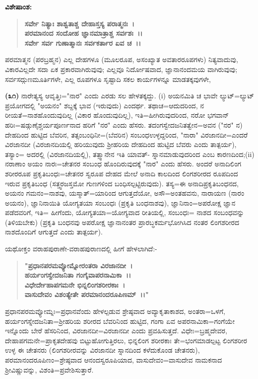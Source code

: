 \noindent
\textbf{ವಿಶೇಷಾಂಶ:\enginline{-}}

\begin{verse}
\textbf{ಸರ್ವೇ ನಿತ್ಯಾಃ ಶಾಶ್ವತಾಶ್ಚ ದೇಹಾಸ್ತಸ್ಯ ಪರಾತ್ಮನಃ~।}\\\textbf{ಪರಮಾನಂದ ಸಂದೋಹ ಜ್ಞಾನಮಾತ್ರಾಶ್ಚ ಸರ್ವಶಃ~।।}\\\textbf{ಸರ್ವೇ ಸರ್ವ ಗುಣಾತ್ಮಾನಃ ಸರ್ವಕರ್ತಾರ ಏವ ಚ~।।}
\end{verse}


ಪರಮಾತ್ಮನ (ಪರಬ್ರಹ್ಮನ) ಎಲ್ಲ ದೇಹಗಳೂ (ಮೂಲರೂಪ, ಅಸಂಖ್ಯಾತ ಅವತಾರರೂಪಗಳು) ನಿತ್ಯವಾದುವು, ವಿಕಾರವಿಲ್ಲದೇ ಸದಾ ಏಕ ಪ್ರಕಾರವಾಗಿರುವುವು; ಎಲ್ಲವೂ ನಿರ್ದೋಷವಾದ, ಜ್ಞಾನಾನಂದಮಯ ವಾಗಿರುವುವು; ಸರ್ವಸದ್ಗುಣಮೂರ್ತಿಗಳೇ, ಎಲ್ಲ ರೂಪಗಳೂ ಸೃಷ್ಟಾದಿ ಸಕಲ ಕಾರ್ಯಗಳನ್ನೂ ಮಾಡತಕ್ಕವುಗಳೇ,

\textbf{(೩೧)} ನಾರೇತ್ಯಸ್ಯ ಆವೃತ್ತಿಃ="ನಾರ" ಎಂದು ಎರಡು ಸಲ ಹೇಳತಕ್ಕದ್ದು. (i) ಅಯನಮಿತಿ ಚ ಭಾವೇ ಲ್ಯುಟ್=ಲ್ಯುಟ್ ಪ್ರಯೋಗದಲ್ಲಿ "ಅಯನಂ" ಶಬ್ದಕ್ಕೆ ಭಾವ (ಇರುವುದು) ಎಂದರ್ಥ. ತಥಾಚ=ಆದುದರಿಂದ, ನ ರೀಯತೆ=ನಾಶಹೊಂದುವುದಿಲ್ಲ (ವಿಕಾರ ಹೊಂದುವುದಿಲ್ಲ), ಇತಿ=ಹೀಗಿರುವುದರಿಂದ, ನರೋ ಭಗವಾನ್ ಹರಿಃ=ಷಡ್ಗುಣೈಶ್ಚರ್ಯಪೂರ್ಣನಾದ ಹರಿಗೆ "ನರ" ಎಂದು ಹೆಸರು. ತದಂಗಸ್ವೇದಜನಿತತ್ವೇನ=ಅವನ ("ನರ" ನ) ದೇಹದಿಂದ ಹುಟ್ಟಿದ ಬೆವರಿನ, ತತ್ಸಂಬಂಧಿನೀ=(ಬೆವರಿನ) ಸಂಬಂಧಉಳ್ಳದ್ದರಿಂದ, "ನಾರಾ" ವಿರಜಾನದೀ=ಎಂದರೆ ವಿರಜಾನದೀ (ವಿರಜಾನದಿಯಲ್ಲಿ ಹರಿಯುವುದು ಶ‍್ರೀಹರಿಯ ದೇಹದಿಂದ ಹುಟ್ಟಿದ ಬೆವರು ಎಂದು ತಾತ್ಪರ್ಯ), ತಸ್ಯಾಂ= ಅದರಲ್ಲಿ (ವಿರಜಾನದಿಯಲ್ಲಿ), ತತ್ಸ್ವಾನೇನ ಇತಿ ಯಾವತ್- ಸ್ನಾನಮಾಡುವುದರಿಂದ ಎಂಬ ಕಾರಣದಿಂದ;\break (ii) ನರಾಣಾಂ ಅಯಂ ನಾರಃ=ಚೇತನರ ಸಂಬಂಧ ಹೊಂದಿರುವುದಕ್ಕೆ "ನಾರ" ಎಂದು ಹೆಸರು. ಅಂದರೆ ಅನಾದಿಲಿಂಗ ಶರೀರರೂಪ ಪ್ರಕೃತಿಬಂಧಃ=ಚೇತನರ ಸ್ವರೂಪ ದೇಹದ ಮೇಲೆ ಅನಾದಿ ಕಾಲದಿಂದ ಲಿಂಗಶರೀರದ ರೂಪದಿಂದ ಇರುವ ಪ್ರಕೃತಿಬಂಧ (ಸತ್ತ್ವ\-ರಜಸ್ತಮೋ ಗುಣಗಳಿಂದ ಬಂಧಿಸಲ್ಪಟ್ಟಿರುವುದು). ತಸ್ಯ=ಈ ಅನಾದಿಪ್ರಕೃತಿಬಂಧನದ, ಅಯನಂ ಗಮನಂ=ನಾಶವು, ಯಸ್ಮಾತ್=ಯಾರಿಂದ ಆಗುತ್ತದೆಯೋ, ಅಸೌ=ಅಂತಹವನು, ನಾರಾಯಣ (ನಾರಂ ಅಯನಂ), ಜ್ಞಾನಿನಾಯಿತಿ ಯೋಗ್ಯತಯಾ ಸಂಬಂಧಃ (ಪ್ರಕೃತಿ ಬಂಧನಾಶವು), ಜ್ಞಾನಿನಾಂ=ಅಪರೋಕ್ಷ ಜ್ಞಾನ ಪಡೆದವರಿಗೆ, ಇತಿ= ಹೀಗೆಂದು, ಯೋಗ್ಯತಯಾ=ಯೋಗ್ಯವಾದ ರೀತಿಯಲ್ಲಿ, ಸಂಬಂಧಃ= ನಾಶದ ಸಂಬಂಧವನ್ನು (ತಿಳಿಯಬೇಕು) (ಪ್ರಕೃತಿ ಬಂಧನವು ಅಪರೋಕ್ಷ ಜ್ಞಾನಾನಂತರ ಪ್ರಾರಬ್ಧಕರ್ಮಭೋಗಿಸಿದ ನಂತರ ಲಿಂಗಶರೀರದ ನಾಶದೊಂದಿಗೆ ಆಗುತ್ತದೆ ಎಂದು ತಾತ್ಪರ್ಯ).

ಯಥೋಕ್ತಂ ವರಾಹಪುರಾಣೇ-ವರಾಹಪುರಾಣದಲ್ಲಿ ಹೀಗೆ ಹೇಳಲಾಗಿದೆ:-

\begin{verse}
\textbf{"ಪ್ರಧಾನಪರಮವ್ಯೋಮ್ನೋರಂತರಾ ವಿರಜಾನದೀ~।}\\\textbf{ಹರ್ಯಂಗಸ್ವೇದಜನಿತಾ ಗಂಗೈವಾಪರನಾಮಿಕಾ~।।}\\\textbf{ವಿಧೇರ್ದೇಹಾಪಗಮನೇ ಭಿನ್ನಲಿಂಗಶರೀರಕಾಃ~।}\\\textbf{ವಾಸುದೇವಂ ವಿಶಂತ್ಯೇತೇ ಪರಮಾನಂದರೂಪಿಣಮ್~।।"}
\end{verse}

ಪ್ರಧಾನಪರಮವ್ಯೋಮ್ನಃ=ಪ್ರಧಾನವೆಂದು ಹೇಳಲ್ಪಡುವ ಶ್ರೇಷ್ಠವಾದ ಅವ್ಯಾಕೃತಾಕಾಶದ, ಅಂತರಾ=ಒಳಗೆ, ಹರ್ಯಂಗಸ್ನೇದಜನಿತಾ=ಶ‍್ರೀಹರಿಯ ಶರೀರದ ಬೆವರಿನಿಂದ ಹುಟ್ಟಿದ, ಗಂಗಾ ಏವ ಅಪರನಾಮಿಕಾ=ಗಂಗೆಯೇ ಇನ್ನೊಂದು ಬೇರೆ ಹೆಸರಿನಿಂದ, ವಿರಜಾನದೀ=ವಿರಜಾನದೀ ಎಂದು ಪ್ರವಹಿಸುತ್ತದೆ. ವಿಧೇಃ=ಬ್ರಹ್ಮದೇವರ, ದೇಹಾಪಗಮನೇ=\-ಪ್ರಾಕೃತದೇಹವು ಬಿಟ್ಟುಹೋಗುತ್ತಿರಲು, ಭಿನ್ನಲಿಂಗ ಶರೀರಕಾಃ ತೇ=ಭಂಗಮಾಡಲ್ಪಟ್ಟ ಲಿಂಗಶರೀರ ಉಳ್ಳ ಈ ಚೇತನರು (ಲಿಂಗಶರೀರವನ್ನು ವಿರಜಾನದೀ ಸ್ನಾನದಿಂದ ಕಳೆದುಕೊಂಡ ಚೇತನರು), ಪರಮಾನಂದರೂಪಿಣಂ=ಶ್ರೇಷ್ಠವಾದ ಆನಂದಸ್ವರೂಪಿಯಾದ, ವಾಸುದೇವಂ=\-ವಾಸುದೇವ ನಾಮಕನಾದ ಶ‍್ರೀವಿಷ್ಣುವನ್ನು, ವಿಶಂತಿ=ಪ್ರವೇಶಿಸುತ್ತಾರೆ.

